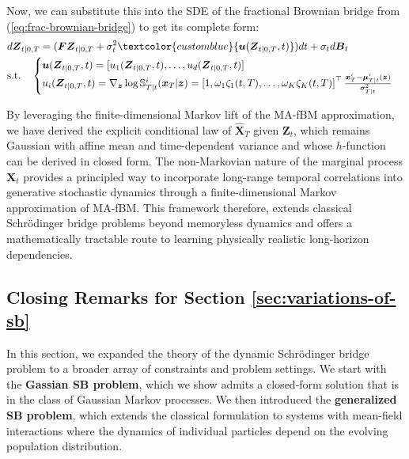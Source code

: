 \documentclass{article}
\newcommand{\bluetext}[1]{\textcolor{customblue}{#1}}
\begin{document}
Now, we can substitute this into the SDE of the fractional Brownian bridge from (\ref{eq:frac-brownian-bridge}) to get its complete form:
\begin{align}
    &d\boldsymbol{Z}_{t|0,T}=(\boldsymbol{F}\boldsymbol{Z}_{t|0,T}+\sigma_t^2\bluetext{\boldsymbol{u}(\boldsymbol{Z}_{t|0,T},t)})dt+\sigma_td\boldsymbol{B}_t\nonumber\\
    &\text{s.t.}\quad \begin{cases}
        \boldsymbol{u}(\boldsymbol{Z}_{t|0,T},t)=[u_1(\boldsymbol{Z}_{t|0,T},t), \dots, u_d(\boldsymbol{Z}_{t|0,T},t)]\\
        u_i(\boldsymbol{Z}_{t|0,T},t)=\nabla_{\boldsymbol{z}}\log\mathbb{S}^i_{T|t}(\boldsymbol{x}_T|\boldsymbol{z})=\left[1,\omega_1\zeta_1(t,T),\dots, \omega_K\zeta_K(t,T) \right]^\top\frac{\boldsymbol{x}^i_T-\boldsymbol{\mu}^i_{T|t}(\boldsymbol{z})}{\sigma_{T|t}^2}
    \end{cases} 
\end{align}

By leveraging the finite-dimensional Markov lift of the MA-fBM approximation, we have derived the explicit conditional law of $\widehat{\boldsymbol{X}}_T$ given $\boldsymbol{Z}_t$, which remains Gaussian with affine mean and time-dependent variance and whose $h$-function can be derived in closed form. The non-Markovian nature of the marginal process $\boldsymbol{X}_t$ provides a principled way to incorporate long-range temporal correlations into generative stochastic dynamics through a finite-dimensional Markov approximation of MA-fBM. This framework therefore, extends classical Schrödinger bridge problems beyond memoryless dynamics and offers a mathematically tractable route to learning physically realistic long-horizon dependencies.

\subsection{Closing Remarks for Section \ref{sec:variations-of-sb}}

In this section, we expanded the theory of the dynamic Schrödinger bridge problem to a broader array of constraints and problem settings. We start with the \textbf{Gassian SB problem}, which we show admits a closed-form solution that is in the class of Gaussian Markov processes. We then introduced the \textbf{generalized SB problem}, which extends the classical formulation to systems with mean-field interactions where the dynamics of individual particles depend on the evolving population distribution.
\end{document}
